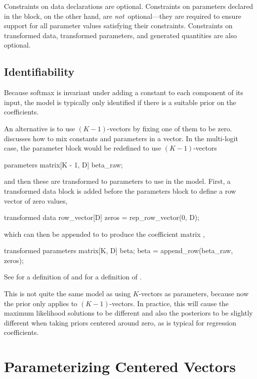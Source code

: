 Constraints on data declarations are optional.  Constraints on
parameters declared in the  block, on the other hand,
are {\it not}\ optional---they are required to ensure support for all
parameter values satisfying their constraints.  Constraints on
transformed data, transformed parameters, and generated quantities are
also optional.

\subsection{Identifiability}

Because softmax is invariant under adding a constant to each component
of its input, the model is typically only identified if there is a
suitable prior on the coefficients.

An alternative is to use $(K-1)$-vectors by fixing one of them to be
zero.  discusses how to mix
constants and parameters in a vector.  In the multi-logit case, the
parameter block would be redefined to use $(K-1)$-vectors
%
\begin{stancode}
parameters {
  matrix[K - 1, D] beta_raw;
}
\end{stancode}
%
and then these are transformed to parameters to use in the model.
First, a transformed data block is added before the parameters block
to define a row vector of zero values,
%
\begin{stancode}
transformed data {
  row_vector[D] zeros = rep_row_vector(0, D);
}
\end{stancode}
%
which can then be appended to  to produce the
coefficient matrix ,
%
\begin{stancode}
transformed parameters {
  matrix[K, D] beta;
  beta = append_row(beta_raw, zeros);
}
\end{stancode}
%
See  for a definition of
 and  for a
definition of .

This is not quite the same model as using $K$-vectors as parameters,
because now the prior only applies to $(K-1)$-vectors.  In practice,
this will cause the maximum likelihood solutions to be different and
also the posteriors to be slightly different when taking priors
centered around zero, as is typical for regression coefficients.

\section{Parameterizing Centered Vectors}

